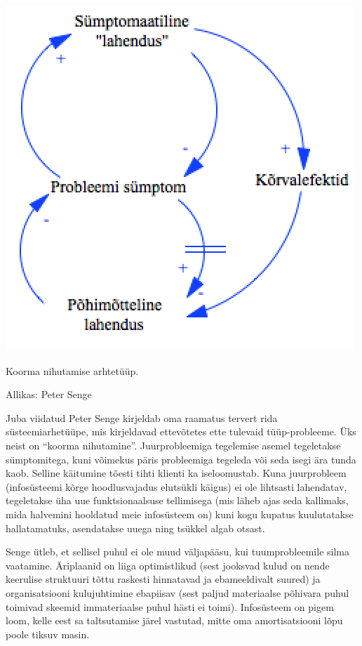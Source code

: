 \documentclass{tufte-book}
\begin{document}
\begin{marginfigure}
	\begin{center}
		\includegraphics[width=\linewidth]{shiftingburden.png}
		\caption{Koorma nihutamise arhtetüüp.}
		Allikas: Peter Senge
		\label{fig:shifting}
	\end{center}
\end{marginfigure}

Juba viidatud Peter Senge kirjeldab oma raamatus\cite{senge19905th} tervert rida süsteemiarhetüüpe, mis kirjeldavad ettevõtetes ette tulevaid tüüp-probleeme. Üks neist on \enquote{koorma nihutamine}. Juurprobleemiga tegelemise asemel tegeletakse sümptomitega, kuni võimekus päris probleemiga tegeleda või seda isegi ära tunda kaob. Selline käitumine tõesti tihti klienti ka iseloomustab. Kuna juurprobleem (infosüsteemi kõrge hoodlusvajadus elutsükli käigus) ei ole lihtsasti lahendatav, tegeletakse üha uue funktsionaalsuse tellimisega (mis läheb ajas seda kallimaks, mida halvemini hooldatud meie infosüsteem on) kuni kogu kupatus kuulutatakse hallatamatuks, asendatakse uuega ning tsükkel algab otsast.

Senge ütleb, et sellisel puhul ei ole muud väljapääsu, kui tuumprobleemile silma vaatamine. Äriplaanid on liiga optimistlikud (sest jooksvad kulud on nende keerulise struktuuri tõttu raskesti hinnatavad ja ebameeldivalt suured) ja organisatsiooni kulujuhtimine ebapiisav (sest paljud materiaalse põhivara puhul toimivad skeemid immateriaalse puhul hästi ei toimi). Infosüsteem on pigem loom, kelle eest sa taltsutamise järel vastutad, mitte oma amortisatsiooni lõpu poole tiksuv masin.
\end{document}
